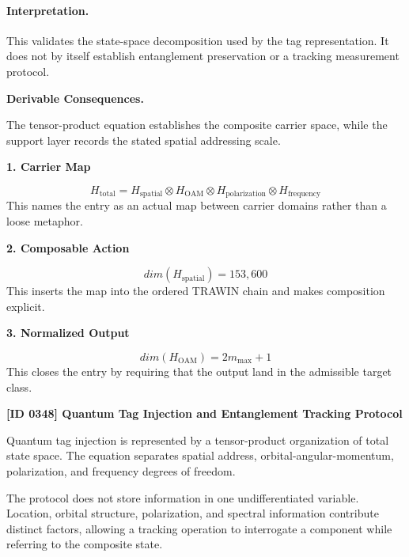 \paragraph{Interpretation.}
This validates the state-space decomposition used by the tag representation. It does not by itself establish entanglement preservation or a tracking measurement protocol.

\par\vspace{0.35em}
\noindent\textbf{Derivable Consequences.}\quad
\begingroup
\footnotesize
\raggedright
The tensor-product equation establishes the composite carrier space, while the support layer records the stated spatial addressing scale.
\par\endgroup

\noindent\textbf{1. Carrier Map}\par
\[
H_{\mathrm{total}} = H_{\mathrm{spatial}} \otimes H_{\mathrm{OAM}} \otimes H_{\mathrm{polarization}} \otimes H_{\mathrm{frequency}}
\]
\noindent This names the entry as an actual map between carrier domains rather than a loose metaphor.\par
\noindent\textbf{2. Composable Action}\par
\[
dim(H_{\mathrm{spatial}}) = 153{,}600
\]
\noindent This inserts the map into the ordered TRAWIN chain and makes composition explicit.\par
\noindent\textbf{3. Normalized Output}\par
\[
dim(H_{\mathrm{OAM}}) = 2 m_{\max} + 1
\]
\noindent This closes the entry by requiring that the output land in the admissible target class.\par

\clearpage
\noindent\textbf{[ID 0348] Quantum Tag Injection and Entanglement Tracking Protocol}\par
\vspace{0.35em}
\begingroup\small


Quantum tag injection is represented by a tensor-product organization of total state space. The equation separates spatial address, orbital-angular-momentum, polarization, and frequency degrees of freedom.


The protocol does not store information in one undifferentiated variable. Location, orbital structure, polarization, and spectral information contribute distinct factors, allowing a tracking operation to interrogate a component while referring to the composite state.

